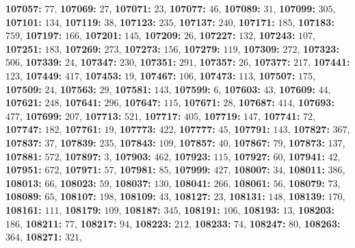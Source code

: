 \textsf{\bfseries 107057:} $77$, \textsf{\bfseries 107069:} $27$, \textsf{\bfseries 107071:} $23$, \textsf{\bfseries 107077:} $46$, \textsf{\bfseries 107089:} $31$, \textsf{\bfseries 107099:} $305$, \textsf{\bfseries 107101:} $134$, \textsf{\bfseries 107119:} $38$, \textsf{\bfseries 107123:} $235$, \textsf{\bfseries 107137:} $240$, \textsf{\bfseries 107171:} $185$, \textsf{\bfseries 107183:} $759$, \textsf{\bfseries 107197:} $166$, \textsf{\bfseries 107201:} $145$, \textsf{\bfseries 107209:} $26$, \textsf{\bfseries 107227:} $132$, \textsf{\bfseries 107243:} $107$, \textsf{\bfseries 107251:} $183$, \textsf{\bfseries 107269:} $273$, \textsf{\bfseries 107273:} $156$, \textsf{\bfseries 107279:} $119$, \textsf{\bfseries 107309:} $272$, \textsf{\bfseries 107323:} $506$, \textsf{\bfseries 107339:} $24$, \textsf{\bfseries 107347:} $230$, \textsf{\bfseries 107351:} $291$, \textsf{\bfseries 107357:} $26$, \textsf{\bfseries 107377:} $217$, \textsf{\bfseries 107441:} $123$, \textsf{\bfseries 107449:} $417$, \textsf{\bfseries 107453:} $19$, \textsf{\bfseries 107467:} $106$, \textsf{\bfseries 107473:} $113$, \textsf{\bfseries 107507:} $175$, \textsf{\bfseries 107509:} $24$, \textsf{\bfseries 107563:} $29$, \textsf{\bfseries 107581:} $143$, \textsf{\bfseries 107599:} $6$, \textsf{\bfseries 107603:} $43$, \textsf{\bfseries 107609:} $44$, \textsf{\bfseries 107621:} $248$, \textsf{\bfseries 107641:} $296$, \textsf{\bfseries 107647:} $115$, \textsf{\bfseries 107671:} $28$, \textsf{\bfseries 107687:} $414$, \textsf{\bfseries 107693:} $477$, \textsf{\bfseries 107699:} $207$, \textsf{\bfseries 107713:} $521$, \textsf{\bfseries 107717:} $405$, \textsf{\bfseries 107719:} $147$, \textsf{\bfseries 107741:} $72$, \textsf{\bfseries 107747:} $182$, \textsf{\bfseries 107761:} $19$, \textsf{\bfseries 107773:} $422$, \textsf{\bfseries 107777:} $45$, \textsf{\bfseries 107791:} $143$, \textsf{\bfseries 107827:} $367$, \textsf{\bfseries 107837:} $37$, \textsf{\bfseries 107839:} $235$, \textsf{\bfseries 107843:} $109$, \textsf{\bfseries 107857:} $40$, \textsf{\bfseries 107867:} $79$, \textsf{\bfseries 107873:} $137$, \textsf{\bfseries 107881:} $572$, \textsf{\bfseries 107897:} $3$, \textsf{\bfseries 107903:} $462$, \textsf{\bfseries 107923:} $115$, \textsf{\bfseries 107927:} $60$, \textsf{\bfseries 107941:} $42$, \textsf{\bfseries 107951:} $672$, \textsf{\bfseries 107971:} $57$, \textsf{\bfseries 107981:} $85$, \textsf{\bfseries 107999:} $427$, \textsf{\bfseries 108007:} $34$, \textsf{\bfseries 108011:} $386$, \textsf{\bfseries 108013:} $66$, \textsf{\bfseries 108023:} $59$, \textsf{\bfseries 108037:} $130$, \textsf{\bfseries 108041:} $266$, \textsf{\bfseries 108061:} $56$, \textsf{\bfseries 108079:} $73$, \textsf{\bfseries 108089:} $65$, \textsf{\bfseries 108107:} $198$, \textsf{\bfseries 108109:} $43$, \textsf{\bfseries 108127:} $23$, \textsf{\bfseries 108131:} $148$, \textsf{\bfseries 108139:} $170$, \textsf{\bfseries 108161:} $111$, \textsf{\bfseries 108179:} $109$, \textsf{\bfseries 108187:} $345$, \textsf{\bfseries 108191:} $106$, \textsf{\bfseries 108193:} $13$, \textsf{\bfseries 108203:} $186$, \textsf{\bfseries 108211:} $77$, \textsf{\bfseries 108217:} $94$, \textsf{\bfseries 108223:} $212$, \textsf{\bfseries 108233:} $74$, \textsf{\bfseries 108247:} $80$, \textsf{\bfseries 108263:} $364$, \textsf{\bfseries 108271:} $321$, 
